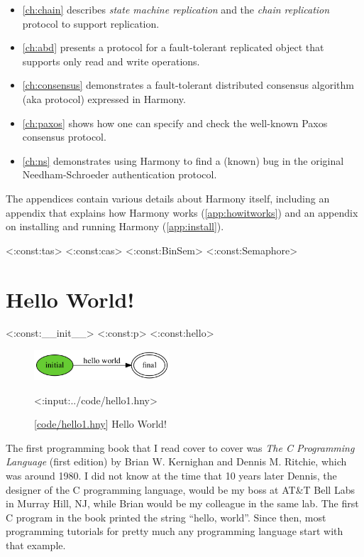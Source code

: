 \documentclass{report}
\newcommand{\harmonylink}[1]{%
[\href{https://harmony.cs.cornell.edu/#1}{\underline{#1}}]%
}
\newenvironment{code}{
\tcolorbox
}{
\endtcolorbox
}
\begin{document}
\begin{itemize}
\item \autoref{ch:chain} describes \emph{state machine replication} and
the \emph{chain replication} protocol to support replication.
\item \autoref{ch:abd} presents a protocol for a fault-tolerant
replicated object that supports only read and write operations.
\item \autoref{ch:consensus} demonstrates a fault-tolerant distributed consensus
algorithm (aka protocol) expressed in Harmony.
\item \autoref{ch:paxos} shows how one can specify and check the well-known
Paxos consensus protocol.
\item \autoref{ch:ns} demonstrates using Harmony to find a (known) bug in the original Needham-Schroeder authentication protocol.
\end{itemize}

The appendices contain various details about Harmony itself, including
an appendix that explains how Harmony works (\autoref{app:howitworks}) and
an appendix on installing and running Harmony (\autoref{app:install}).

<{:const:tas}>
<{:const:cas}>
<{:const:BinSem}>
<{:const:Semaphore}>

\chapter{Hello World!}
\label{ch:harmonyintro}

<{:const:__init__}>
<{:const:p}>
<{:const:hello}>

\begin{figure}
\begin{center}
\includegraphics[width=0.45\textwidth]{figures/hello1.png}
\end{center}
\begin{code}
<{:input:../code/hello1.hny}>
\end{code}
\caption{\harmonylink{code/hello1.hny} Hello World!}
\label{fig:helloworld}
\end{figure}

The first programming book that I read cover to cover was \emph{The C Programming
Language} (first edition) by Brian W. Kernighan and Dennis M. Ritchie, which
was around 1980.  I did not know at the time that 10 years later Dennis,
the designer of the C programming language, would be my boss at AT\&T Bell Labs
in Murray Hill, NJ, while Brian would be my colleague in the same lab.
The first C program in the book printed
the string ``hello, world''.  Since then, most programming tutorials for
pretty much any programming language start with that example.
\end{document}
